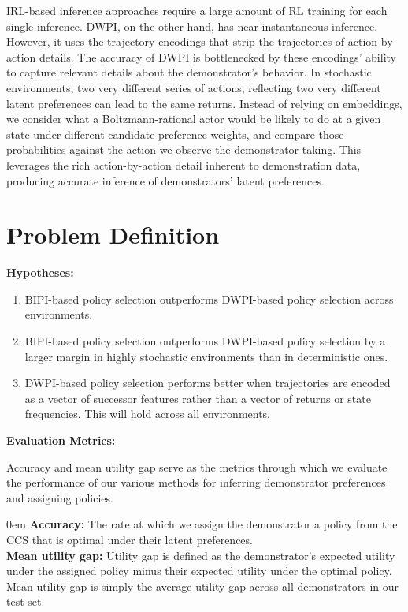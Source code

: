 \documentclass[11pt]{article}
\begin{document}
IRL-based inference approaches require a large amount of RL training for each single inference. DWPI, on the other hand, has near-instantaneous inference. However, it uses the trajectory encodings that strip the trajectories of action-by-action details. The accuracy of DWPI is bottlenecked by these encodings' ability to capture relevant details about the demonstrator's behavior. In stochastic environments, two very different series of actions, reflecting two very different latent preferences can lead to the same returns. Instead of relying on embeddings, we consider what a Boltzmann-rational actor would be likely to do at a given state under different candidate preference weights, and compare those probabilities against the action we observe the demonstrator taking. This leverages the rich action-by-action detail inherent to demonstration data, producing accurate inference of demonstrators' latent preferences.


\section{Problem Definition}

\textbf{Hypotheses:}
\begin{enumerate}
  \item BIPI-based policy selection outperforms DWPI-based policy selection across environments.

  \item BIPI-based policy selection outperforms DWPI-based policy selection by a larger margin in highly stochastic environments than in deterministic ones.
  
  \item DWPI-based policy selection performs better when trajectories are encoded as a vector of successor features rather than a vector of returns or state frequencies. This will hold across all environments.
\end{enumerate}

\textbf{Evaluation Metrics:}

Accuracy and mean utility gap serve as the metrics through which we evaluate the performance of our various methods for inferring demonstrator preferences and assigning policies.

\begin{addmargin}[2em]{0em}
    \textbf{Accuracy:} The rate at which we assign the demonstrator a policy from the CCS that is optimal under their latent preferences.\\
    \textbf{Mean utility gap:} Utility gap is defined as the demonstrator's expected utility under the assigned policy minus their expected utility under the optimal policy. Mean utility gap is simply the average utility gap across all demonstrators in our test set.
\end{addmargin}
\end{document}
